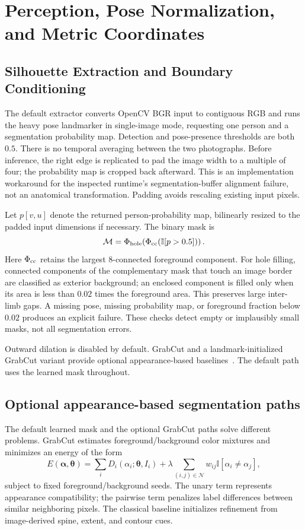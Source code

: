 \documentclass[11pt,a4paper]{article}
\numberwithin{equation}{section}
\newcommand{\indic}{\mathbb I}
\begin{document}
\section{Perception, Pose Normalization, and Metric Coordinates}
\subsection{Silhouette Extraction and Boundary Conditioning}
\label{subsec:segmentation}
The default extractor converts OpenCV BGR input to contiguous RGB and runs the heavy pose landmarker in single-image mode, requesting one person and a segmentation probability map. Detection and pose-presence thresholds are both $0.5$. There is no temporal averaging between the two photographs. Before inference, the right edge is replicated to pad the image width to a multiple of four; the probability map is cropped back afterward. This is an implementation workaround for the inspected runtime's segmentation-buffer alignment failure, not an anatomical transformation. Padding avoids rescaling existing input pixels.

Let $p[v,u]$ denote the returned person-probability map, bilinearly resized to the padded input dimensions if necessary. The binary mask is
\begin{equation}
\mathcal M=\Phi_{\rm hole}\!\left(\Phi_{\rm cc}\!\left(\mathbb I[p>0.5]\right)\right).
\label{eq:mask}
\end{equation}
Here $\Phi_{\rm cc}$ retains the largest 8-connected foreground component. For hole filling, connected components of the complementary mask that touch an image border are classified as exterior background; an enclosed component is filled only when its area is less than $0.02$ times the foreground area. This preserves large inter-limb gaps. A missing pose, missing probability map, or foreground fraction below $0.02$ produces an explicit failure. These checks detect empty or implausibly small masks, not all segmentation errors.

Outward dilation is disabled by default. GrabCut and a landmark-initialized GrabCut variant provide optional appearance-based baselines~\cite{rother2004grabcut}. The default path uses the learned mask throughout.

\subsection{Optional appearance-based segmentation paths}
The default learned mask and the optional GrabCut paths solve different problems. GrabCut estimates foreground/background color mixtures and minimizes an energy of the form
\begin{equation}
E(\boldsymbol\alpha,\boldsymbol\theta)=
\sum_iD_i(\alpha_i;\boldsymbol\theta,I_i)+
\lambda\sum_{(i,j)\in\mathcal N}w_{ij}\indic[\alpha_i\ne\alpha_j],
\end{equation}
subject to fixed foreground/background seeds. The unary term represents appearance compatibility; the pairwise term penalizes label differences between similar neighboring pixels. The classical baseline initializes refinement from image-derived spine, extent, and contour cues.
\end{document}
